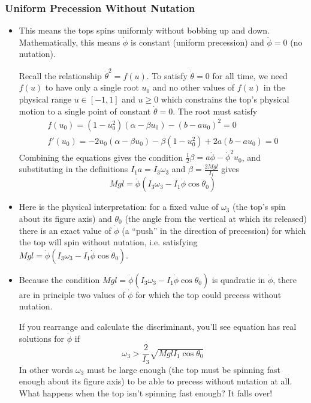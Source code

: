 \documentclass[11pt, a4paper]{article}
\begin{document}
\subsubsection{Uniform Precession Without Nutation}
\begin{itemize}
	\item This means the tops spins uniformly without bobbing up and down. Mathematically, this means $ \dot{\phi} $ is constant (uniform precession) and $ \dot{\phi} = 0 $ (no nutation). 
	
	Recall the relationship $ \dot{\theta}^{2} = f(u) $. To satisfy $ \dot{\theta} = 0 $ for all time, we need $ f(u) $ to have only a single root $ u_{0} $ and no other values of $ f(u) $ in the physical range $ u \in [-1, 1] $ and $ u \geq 0 $ which constrains the top's physical motion to a single point of constant $ \dot{\theta} = 0 $. The root must satisfy
	\begin{align*}
		f(u_{0}) = (1 - u_{0}^{2})(\alpha - \beta u_{0}) - (b- au_{0})^{2} = 0\\
		f'(u_{0}) = -2u_{0}(\alpha - \beta u_{0}) - \beta(1 - u_{0}^{2}) + 2a(b - au_{0}) = 0
	\end{align*}
	Combining the equations gives the condition $ \frac{1}{2} \beta = a \dot{\phi} - \dot{\phi}^{2}u_{0} $, and substituting in the definitions $ I_{1}a = I_{3} \omega_{3} $ and $ \beta = \frac{2Mgl}{I_{1}} $ gives
	\begin{equation*}
		Mgl = \dot{\phi} (I_{3} \omega_{3} - I_{1}\dot{\phi}\cos \theta_{0}) 
	\end{equation*}
	
	\item Here is the physical interpretation: for a fixed value of $ \omega_{3} $ (the top's spin about its figure axis) and $ \theta_{0} $ (the angle from the vertical at which its released) there is an exact value of $ \dot{\phi} $ (a ``push'' in the direction of precession) for which the top will spin without nutation, i.e. satisfying $ Mgl = \dot{\phi} (I_{3} \omega_{3} - I_{1}\dot{\phi}\cos \theta_{0})  $.
	
	\item Because the condition $ Mgl = \dot{\phi} (I_{3} \omega_{3} - I_{1}\dot{\phi}\cos \theta_{0})  $ is quadratic in $ \dot{\phi} $, there are in principle two values of $ \dot{\phi} $ for which the top could precess without nutation.
	
	If you rearrange and calculate the discriminant, you'll see equation has real solutions for $ \dot{\phi} $ if
	\begin{equation*}
		\omega_{3} > \frac{2}{I_{3}}\sqrt{Mgl I_{1}\cos \theta_{0}}
	\end{equation*}
	In other words $ \omega_{3} $ must be large enough (the top must be spinning fast enough about its figure axis) to be able to precess without nutation at all. What happens when the top isn't spinning fast enough? It falls over!
	
\end{itemize}
\end{document}
